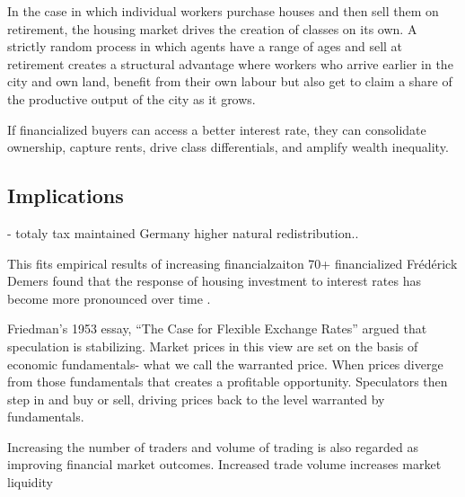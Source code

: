 In the case in which individual workers purchase houses and then sell them on retirement, the housing market drives the creation of classes on its own. A strictly random process in which agents have a range of ages and sell at retirement creates a structural advantage where workers who arrive earlier in the city and own land, benefit from their own labour but also get to claim a share of the productive output of the city as it grows. %

If financialized buyers can access a better interest rate, they can consolidate ownership, capture rents, drive class differentials, and amplify wealth inequality. %


\subsection{Implications}
- totaly tax maintained
Germany higher natural redistribution..

This fits empirical results of increasing financialzaiton 70+ financialized
Fr\'ed\'erick Demers found that the response of housing investment to interest rates has become more pronounced over time \cite{demersModellingForecastingHousing2005}. %



Friedman’s 1953 essay, ``The Case for Flexible Exchange Rates'' \cite{friedmanEssaysPositiveEconomics1953} argued that speculation is stabilizing. Market prices in this view  are set on the basis of economic fundamentals- what we call the warranted price. When prices diverge from those fundamentals that creates a profitable opportunity. Speculators then step in and buy or sell, driving prices back to the level warranted by fundamentals.

Increasing the number of traders and volume of trading is also regarded as improving financial market outcomes. Increased trade volume increases market liquidity 



